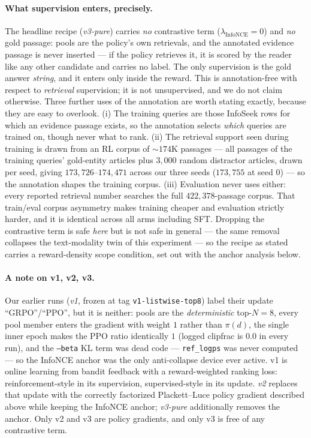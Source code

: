 

\paragraph{What supervision enters, precisely.} The headline recipe (\emph{v3-pure}) carries
\emph{no} contrastive term ($\lambda_{\mathrm{InfoNCE}}{=}0$) and \emph{no} gold passage: pools
are the policy's own retrievals, and the annotated evidence passage is never inserted --- if the
policy retrieves it, it is scored by the reader like any other candidate and carries no label.
The only supervision is the gold answer \emph{string}, and it enters only inside the reward.
This is annotation-free with respect to \emph{retrieval} supervision; it is not unsupervised, and
we do not claim otherwise. Three further uses of the annotation are worth stating exactly,
because they are easy to overlook. (i) The training queries are those InfoSeek rows for which an
evidence passage exists, so the annotation selects \emph{which} queries are trained on, though
never what to rank. (ii) The retrieval support seen during training is drawn from an RL corpus of
${\sim}174$K passages --- all passages of the training queries' gold-entity articles plus $3{,}000$
random distractor articles, drawn per seed, giving $173{,}726$--$174{,}471$ across our three seeds
($173{,}755$ at seed $0$) --- so the annotation shapes the training corpus. (iii) Evaluation
never uses either: every reported retrieval number searches the full $422{,}378$-passage corpus.
That train/eval corpus asymmetry makes training cheaper and evaluation strictly harder, and it is
identical across all arms including SFT. Dropping the contrastive term is safe \emph{here} but is
not safe in general --- the same removal collapses the text-modality twin of this experiment ---
so the recipe as stated carries a reward-density scope condition, set out with the anchor
analysis below.

\paragraph{A note on v1, v2, v3.} Our earlier runs (\emph{v1}, frozen at tag
\texttt{v1-listwise-top8}) label their update ``GRPO''/``PPO'', but it is neither: pools are the
\emph{deterministic} top-$N{=}8$, every pool member enters the gradient with weight $1$ rather
than $\pi(d)$, the single inner epoch makes the PPO ratio identically $1$ (logged clipfrac is
$0.0$ in every run), and the \texttt{--beta} KL term was dead code --- \texttt{ref\_logps} was
never computed --- so the InfoNCE anchor was the only anti-collapse device ever active. v1 is
online learning from bandit feedback with a reward-weighted ranking loss: reinforcement-style in
its supervision, supervised-style in its update. \emph{v2} replaces that update with the
correctly factorized Plackett--Luce policy gradient described above while keeping the InfoNCE
anchor; \emph{v3-pure} additionally removes the anchor. Only v2 and v3 are policy gradients, and
only v3 is free of any contrastive term.


